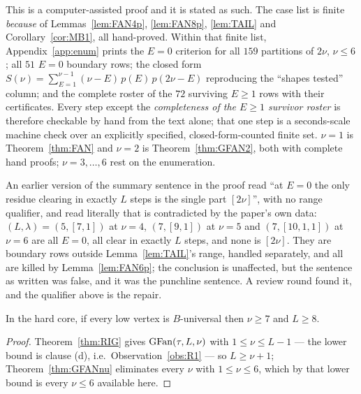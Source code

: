 \begin{remark}\label{rem:demarcation}
This is a computer-assisted proof and it is stated as such. The case list is finite
\emph{because} of Lemmas~\ref{lem:FAN4p}, \ref{lem:FAN8p}, \ref{lem:TAIL} and
Corollary~\ref{cor:MB1}, all hand-proved. Within that finite list, Appendix~\ref{app:enum}
prints the $E = 0$ criterion for all $159$ partitions of $2\nu$, $\nu \le 6$; all $51$
$E = 0$ boundary rows; the closed form
$S(\nu) = \sum_{E=1}^{\nu-1}(\nu-E)\,p(E)\,p(2\nu-E)$ reproducing the ``shapes tested''
column; and the complete roster of the $72$ surviving $E \ge 1$ rows with their
certificates. Every step except the \emph{completeness of the $E \ge 1$ survivor roster} is
therefore checkable by hand from the text alone; that one step is a seconds-scale machine
check over an explicitly specified, closed-form-counted finite set. $\nu = 1$ is
Theorem~\ref{thm:FAN} and $\nu = 2$ is Theorem~\ref{thm:GFAN2}, both with complete hand
proofs; $\nu = 3,\dots,6$ rest on the enumeration.
\end{remark}

An earlier version of the summary sentence in the proof read ``at $E = 0$ the only residue
clearing in exactly $L$ steps is the single part $[2\nu]$'', with no range qualifier, and
read literally that is contradicted by the paper's own data: $(L,\lambda) = (5,[7,1])$ at
$\nu = 4$, $(7,[9,1])$ at $\nu = 5$ and $(7,[10,1,1])$ at $\nu = 6$ are all $E = 0$, all
clear in exactly $L$ steps, and none is $[2\nu]$. They are boundary rows outside
Lemma~\ref{lem:TAIL}'s range, handled separately, and all are killed by
Lemma~\ref{lem:FAN6p}; the conclusion is unaffected, but the sentence as written was false,
and it was the punchline sentence. A review round found it, and the qualifier above is the
repair.

\begin{corollary}\label{cor:GFANnuHC}
In the hard core, if every low vertex is $B$-universal then $\nu \ge 7$ and $L \ge 8$.
\end{corollary}

\begin{proof}
Theorem~\ref{thm:RIG} gives $\mathrm{GFan}(\tau,L,\nu)$ with $1 \le \nu \le L-1$ --- the lower bound
is clause (d), i.e.\ Observation~\ref{obs:R1} --- so $L \ge \nu+1$;
Theorem~\ref{thm:GFANnu} eliminates every $\nu$ with $1 \le \nu \le 6$, which by that lower
bound is every $\nu \le 6$ available here.
\end{proof}

